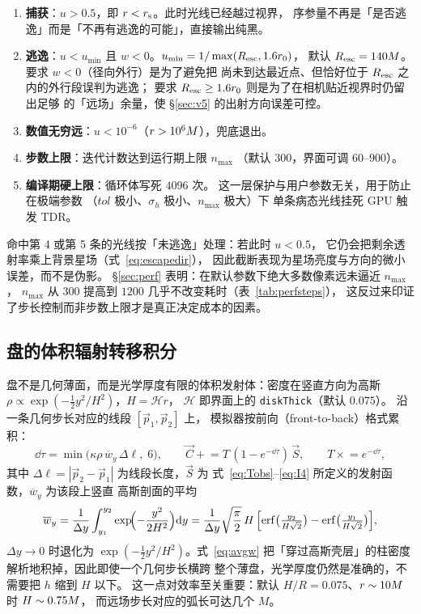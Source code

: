 \begin{enumerate}\itemsep2pt
\item \textbf{捕获}：$u>0.5$，即 $r<r_{\mathrm s}$。此时光线已经越过视界，
  序参量不再是「是否逃逸」而是「不再有逃逸的可能」，直接输出纯黑。
\item \textbf{逃逸}：$u<u_{\min}$ 且 $w<0$。$u_{\min}=1/\max(R_{\rm esc},1.6r_0)$，
  默认 $R_{\rm esc}=140M$。要求 $w<0$（径向外行）是为了避免把
  尚未到达最近点、但恰好位于 $R_{\rm esc}$ 之内的外行段误判为逃逸；
  要求 $R_{\rm esc}\ge1.6r_0$ 则是为了在相机贴近视界时仍留出足够
  的「远场」余量，使 \S\ref{sec:v5} 的出射方向误差可控。
\item \textbf{数值无穷远}：$u<10^{-6}$（$r>10^6M$），兜底退出。
\item \textbf{步数上限}：迭代计数达到运行期上限 $n_{\max}$
  （默认 $300$，界面可调 $60$--$900$）。
\item \textbf{编译期硬上限}：循环体写死 $4096$ 次。
  这一层保护与用户参数无关，用于防止在极端参数
  （$tol$ 极小、$\sigma_h$ 极小、$n_{\max}$ 极大）下
  单条病态光线挂死 GPU 触发 TDR。
\end{enumerate}

命中第 4 或第 5 条的光线按「未逃逸」处理：若此时 $u<0.5$，
它仍会把剩余透射率乘上背景星场（式~\eqref{eq:escapedir}），
因此截断表现为星场亮度与方向的微小误差，而不是伪影。
\S\ref{sec:perf} 表明：在默认参数下绝大多数像素远未逼近 $n_{\max}$，
$n_{\max}$ 从 $300$ 提高到 $1200$ 几乎不改变耗时（表~\ref{tab:perfsteps}），
这反过来印证了步长控制而非步数上限才是真正决定成本的因素。

\subsection{盘的体积辐射转移积分}\label{sec:rtnum}

盘不是几何薄面，而是光学厚度有限的体积发射体：密度在竖直方向为高斯
$\rho\propto\exp(-\tfrac12 y^2/H^2)$，$H=\mathcal H r$，
$\mathcal H$ 即界面上的 \texttt{diskThick}（默认 $0.075$）。
沿一条几何步长对应的线段 $[\vec p_1,\vec p_2]$ 上，
模拟器按前向（front-to-back）格式累积：
\begin{equation}
\dd\tau=\min\!\bigl(\kappa\rho\,\overline{w}_y\,\Delta \ell,\;6\bigr),
\qquad
\vec C \mathrel{+}= T\,(1-e^{-\dd\tau})\,\vec S,\qquad
T \mathrel{\times}= e^{-\dd\tau},
\label{eq:front2back}
\end{equation}
其中 $\Delta\ell=|\vec p_2-\vec p_1|$ 为线段长度，$\vec S$ 为
式~\eqref{eq:Tobs}--\eqref{eq:I4} 所定义的发射函数，$\overline{w}_y$ 为该段上竖直
高斯剖面的平均
\begin{equation}
\overline{w}_y=
\frac{1}{\Delta y}\int_{y_1}^{y_2}
\exp\!\Bigl(-\frac{y^2}{2H^2}\Bigr)\mathrm{d} y
=\frac{1}{\Delta y}\sqrt{\frac{\pi}{2}}\,H\,
\Bigl[\mathrm{erf}\bigl(\tfrac{y_2}{H\sqrt2}\bigr)
-\mathrm{erf}\bigl(\tfrac{y_1}{H\sqrt2}\bigr)\Bigr],
\label{eq:avgw}
\end{equation}
$\Delta y\to0$ 时退化为 $\exp(-\tfrac12y^2/H^2)$。式~\eqref{eq:avgw}
把「穿过高斯壳层」的柱密度解析地积掉，因此即使一个几何步长横跨
整个薄盘，光学厚度仍然是准确的，不需要把 $h$ 缩到 $H$ 以下。
这一点对效率至关重要：默认 $H/R=0.075$、$r\sim10M$ 时 $H\sim0.75M$，
而远场步长对应的弧长可达几个 $M$。

